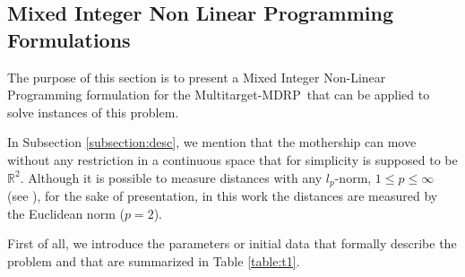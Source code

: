 \documentclass{itor}
\theoremstyle{definition}
\theoremstyle{remark}
\def\AMD{{\sf Multitarget-MDRP\xspace}}
\begin{document}
\subsection{Mixed Integer Non Linear Programming Formulations}\label{Form}
The purpose of this section is to present a Mixed Integer Non-Linear Programming formulation for the \AMD \ that can be applied to solve instances of this problem.

In Subsection \ref{subsection:desc}, we mention that the mothership can move without any restriction in a continuous space that for simplicity is supposed to be $\mathbb R^2$. Although it is possible to measure distances with any $l_p$-norm, $1\leq p\leq \infty$ (see \cite{Blanco2017}), for the sake of presentation, in this work the distances are measured by the Euclidean norm ($p= 2$).

First of all, we introduce the parameters or initial data that formally describe the problem and that are summarized in Table \ref{table:t1}.
\end{document}
